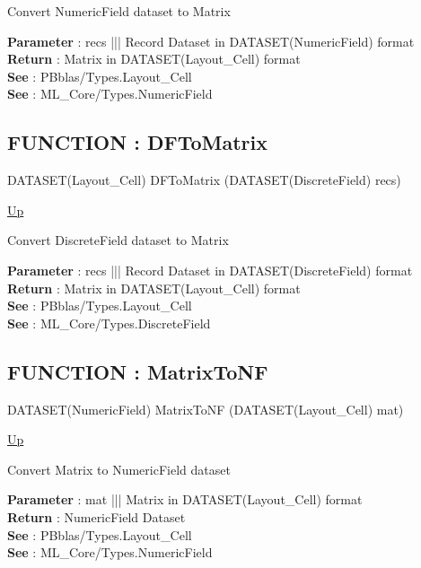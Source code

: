 \par
Convert NumericField dataset to Matrix
\par
\textbf{Parameter} : recs ||| Record Dataset in DATASET(NumericField) format \\
\textbf{Return} : Matrix in DATASET(Layout\_Cell) format \\
\textbf{See} : PBblas/Types.Layout\_Cell \\
\textbf{See} : ML\_Core/Types.NumericField \\
\subsection*{FUNCTION : DFToMatrix}
\hypertarget{ecldoc:pbblas.converted.dftomatrix}{}
\begin{minipage}[t]{\textwidth}
\begin{flushleft}
DATASET(Layout\_Cell) DFToMatrix (DATASET(DiscreteField) recs)
\end{flushleft}
\end{minipage}
\hyperlink{ecldoc:PBblas.Converted}{Up}

\par
Convert DiscreteField dataset to Matrix
\par
\textbf{Parameter} : recs ||| Record Dataset in DATASET(DiscreteField) format \\
\textbf{Return} : Matrix in DATASET(Layout\_Cell) format \\
\textbf{See} : PBblas/Types.Layout\_Cell \\
\textbf{See} : ML\_Core/Types.DiscreteField \\
\subsection*{FUNCTION : MatrixToNF}
\hypertarget{ecldoc:pbblas.converted.matrixtonf}{}
\begin{minipage}[t]{\textwidth}
\begin{flushleft}
DATASET(NumericField) MatrixToNF (DATASET(Layout\_Cell) mat)
\end{flushleft}
\end{minipage}
\hyperlink{ecldoc:PBblas.Converted}{Up}

\par
Convert Matrix to NumericField dataset
\par
\textbf{Parameter} : mat ||| Matrix in DATASET(Layout\_Cell) format \\
\textbf{Return} : NumericField Dataset \\
\textbf{See} : PBblas/Types.Layout\_Cell \\
\textbf{See} : ML\_Core/Types.NumericField \\
